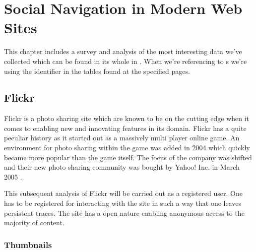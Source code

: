 \chapter{Social Navigation in Modern Web Sites}
\label{chapter:analysis}

This chapter includes a survey and analysis of the most interesting
data we've collected which can be found in its whole in
. When we're referencing to s we're
using the identifier in the tables found at the specified pages.

\section{Flickr}
\label{section:analysis.flickr}


Flickr is a photo sharing site which are known to be on the cutting edge when
it comes to enabling new and innovating features in its domain. Flickr has a
quite peculiar history as it started out as a massively multi player online
game. An environment for photo sharing within the game was added in 2004 which
quickly became more popular than the game itself. The focus of the company was
shifted and their new photo sharing community was bought by Yahoo! Inc. in
March 2005 \citep[]{livingston07}.

This subsequent
analysis of Flickr will be carried out as a registered user. One has to be
registered for interacting with the site in such a way that one leaves
persistent traces. The site has a open nature enabling anonymous access
to the majority of content.

\subsection{Thumbnails}

